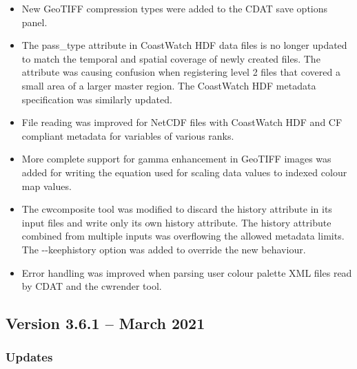 \begin{itemize}
  
  \item New GeoTIFF compression types were added to the CDAT save options panel.
  
  \item The pass\_type attribute in CoastWatch HDF data files is no longer
  updated to match the temporal and spatial coverage of newly created files.
  The attribute was causing confusion when registering level 2 files that
  covered a small area of a larger master region.  The CoastWatch HDF metadata
  specification was similarly updated.
  
  \item File reading was improved for NetCDF files with CoastWatch
  HDF and CF compliant metadata for variables of various ranks.
  
  \item More complete support for gamma enhancement in GeoTIFF images was
  added for writing the equation used for scaling data values to indexed
  colour map values.
  
  \item The cwcomposite tool was modified to discard the history attribute
  in its input files and write only its own history attribute.  The history
  attribute combined from multiple inputs was overflowing the allowed
  metadata limits.  The -{-}keephistory option was added to override the
  new behaviour.
  
  \item Error handling was improved when parsing user colour palette
  XML files read by CDAT and the cwrender tool.
  
\end{itemize}


\subsection*{Version 3.6.1 -- March 2021}

\subsubsection*{ Updates}

